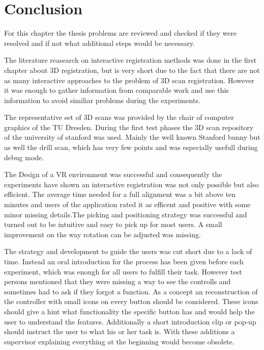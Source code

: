 \documentclass[hyperref,english,bachelorofscience,bibnum,twoside]{cgvpub}
\begin{document}
%

\chapter{Conclusion}

For this chapter the thesis problems are reviewed and checked if they were resolved and if not what additional steps would be necessary. 

The literature reasearch on interactive registration methods was done in the first chapter about 3D registration, but is very short due to the fact that there are not as many interactive approaches to the problem of 3D scan registration. However it was enough to gather information from comparable work and use this information to avoid similiar problems during the experiments.

The representative set of 3D scans was provided by the chair of computer graphics of the TU Dresden. During the first test phases the 3D scan repository of the university of stanford was used. Mainly the well known Stanford bunny but as well the drill scan, which has very few points and was especially usefull during debug mode.

The Design of a VR environment was successful and consequently the experiments have shown an interactive registration was not only possible but also efficient. The average time needed for a full alignment was a bit above ten minutes and users of the application rated it as efficent and positive with some minor missing details.The picking and positioning strategy was successful and turned out to be intuitive and easy to pick up for most users. A small improvement on the way rotation can be adjusted was missing.

The strategy and development to guide the users was cut short due to a lack of time. Instead an oral introduction for the process has been given before each experiment, which was enough for all users to fulfill their task. However test persons mentioned that they were missing a way to see the controlls and sometimes had to ask if they forgot a function. As a concept an reconstruction of the controller with small icons on every button should be considered. These icons should give a hint what functionality the specific button has and would help the user to understand the features. Additionally a short introduction clip or pop-up should instruct the user to what his or her task is. With these additions a supervisor explaining everything at the beginning would become obsolete.
\end{document}
